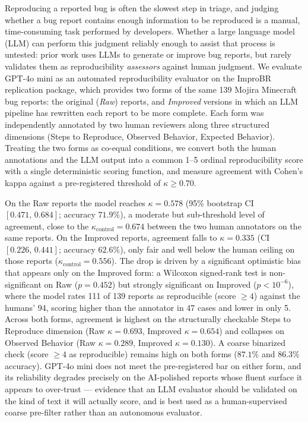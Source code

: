 
\label{sec:abstract}
Reproducing a reported bug is often the slowest step in triage, and judging
whether a bug report contains enough information to be reproduced is a manual,
time-consuming task performed by developers. Whether a large language model
(LLM) can perform this judgment reliably enough to assist that process is
untested: prior work uses LLMs to generate or improve bug reports, but rarely
validates them as reproducibility \emph{assessors} against human judgment. We
evaluate GPT-4o mini as an automated reproducibility evaluator on the ImproBR
replication package, which provides two forms of the same 139 Mojira Minecraft
bug reports: the original (\emph{Raw}) reports, and \emph{Improved} versions in
which an LLM pipeline has rewritten each report to be more complete. Each form
was independently annotated by two human reviewers along three structured
dimensions (Steps to Reproduce, Observed Behavior, Expected Behavior). Treating
the two forms as co-equal conditions, we convert both the human annotations and
the LLM output into a common 1--5 ordinal reproducibility score with a single
deterministic scoring function, and measure agreement with Cohen's kappa
against a pre-registered threshold of $\kappa \geq 0.70$.

On the Raw reports the model reaches $\kappa = 0.578$ (95\% bootstrap CI
$[0.471,\,0.684]$; accuracy $71.9\%$), a moderate but sub-threshold level of
agreement, close to the $\kappa_{\text{control}} = 0.674$ between the two human
annotators on the same reports. On the Improved reports, agreement falls to
$\kappa = 0.335$ (CI $[0.226,\,0.441]$; accuracy $62.6\%$), only fair and well
below the human ceiling on those reports ($\kappa_{\text{control}} = 0.556$).
The drop is driven by a significant optimistic bias that appears only on the
Improved form: a Wilcoxon signed-rank test is non-significant on Raw
($p = 0.452$) but strongly significant on Improved ($p < 10^{-6}$), where the
model rates 111 of 139 reports as reproducible (score $\geq 4$) against the
humans' 94, scoring higher than the annotator in 47 cases and lower in only 5.
Across both forms, agreement is highest on the structurally checkable Steps to
Reproduce dimension (Raw $\kappa = 0.693$, Improved $\kappa = 0.654$) and
collapses on Observed Behavior (Raw $\kappa = 0.289$, Improved $\kappa =
0.130$). A coarse binarized check (score $\geq 4$ as reproducible) remains high
on both forms ($87.1\%$ and $86.3\%$ accuracy). GPT-4o mini does not meet the
pre-registered bar on either form, and its reliability degrades precisely on
the AI-polished reports whose fluent surface it appears to over-trust ---
evidence that an LLM evaluator should be validated on the kind of text it will
actually score, and is best used as a human-supervised coarse pre-filter rather
than an autonomous evaluator.
